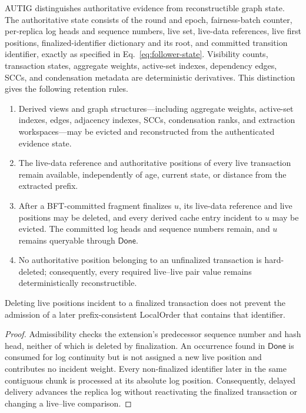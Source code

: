AUTIG distinguishes authoritative evidence from reconstructible graph state.
The authoritative state consists of the round and epoch, fairness-batch
counter, per-replica log heads and sequence numbers, live set, live-data
references, live first positions, finalized-identifier dictionary and its
root, and committed transition identifier, exactly as specified in
Eq.~\eqref{eq:follower-state}.
Visibility counts, transaction
states, aggregate weights, active-set indexes, dependency edges, SCCs, and
condensation metadata are deterministic derivatives.  This distinction gives
the following retention rules.

\begin{enumerate}
  \item Derived views and graph structures---including aggregate weights,
        active-set indexes, edges, adjacency indexes, SCCs, condensation
        ranks, and extraction workspaces---may be evicted and reconstructed
        from the authenticated evidence state.
  \item The live-data reference and authoritative positions of every live
        transaction remain available, independently of age, current state, or
        distance from the extracted prefix.
  \item After a BFT-committed fragment finalizes $u$, its live-data reference
        and live positions may be deleted, and every derived cache entry
        incident to $u$ may be evicted.  The committed log heads and sequence
        numbers remain, and $u$ remains queryable through $\mathsf{Done}$.
  \item No authoritative position belonging to an unfinalized transaction is
        hard-deleted; consequently, every required live--live pair value
        remains deterministically reconstructible.
\end{enumerate}

\begin{lemma}
\label{lem:delayed-extension-compatibility}
Deleting live positions incident to a finalized transaction does not prevent
the admission of a later prefix-consistent LocalOrder that contains that
identifier.
\end{lemma}

\begin{proof}
Admissibility checks the extension's predecessor sequence number and hash head,
neither of which is deleted by finalization.  An occurrence found in
$\mathsf{Done}$ is consumed for log continuity but is not assigned a new live
position and contributes no incident weight.  Every non-finalized identifier
later in the same contiguous chunk is processed at its absolute log position.
Consequently, delayed delivery advances the replica log without reactivating
the finalized transaction or changing a live--live comparison.
\end{proof}

